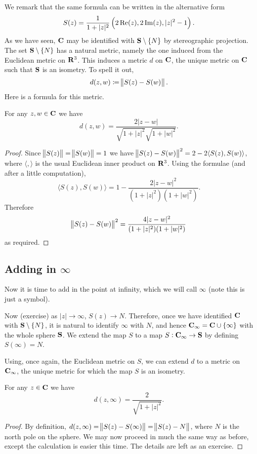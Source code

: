 We remark that the same formula can be written in the alternative form
\[S(z)=\frac{1}{1+|z|^2}\left(2\Re(z),2\Im(z),|z|^2-1\right).\]
As we have seen, $\mathbf C$ may be identified with $\mathbf S\setminus\{N\}$ by stereographic projection. The set $\mathbf S\setminus\{N\}$ has a natural metric, namely the one induced from the Euclidean metric on $\mathbf R^3$. This induces a metric $d$ on $\mathbf C$, the unique metric on $\mathbf C$ such that $\mathbf S$ is an isometry. To spell it out,
\[d(z,w)\coloneqq\norm{S(z)-S(w)}.\]
Here is a formula for this metric.
\begin{lemma}
For any $z,w\in\mathbf C$ we have
\[d(z,w)=\frac{2|z-w|}{\sqrt{1+|z|^2}\sqrt{1+|w|^2}}.\]
\end{lemma}

\begin{proof}
Since $\norm{S(z)}=\norm{S(w)}=1$ we have $\norm{S(z)-S(w)}^2=2-2\langle S(z),S(w)\rangle$, where $\langle,\rangle$ is the usual Euclidean inner product on $\mathbf R^3$. Using the formulae (and after a little computation),
\[\langle S(z),S(w)\rangle=1-\frac{2|z-w|^2}{(1+|z|^2)(1+|w|^2)}.\]
Therefore
\[\norm{S(z)-S(w)}^2=\frac{4|z-w|^2}{(1+|z|^2)(1+|w|^2)}\]
as required.
\end{proof}

\subsection{Adding in $\infty$}
Now it is time to add in the point at infinity, which we will call $\infty$ (note this is just a symbol).

Now (exercise) as $|z|\to\infty$, $S(z)\to N$. Therefore, once we have identified $\mathbf C$ with $\mathbf S\setminus\{N\}$, it is natural to identify $\infty$ with $N$, and hence $\mathbf C_\infty=\mathbf C\cup\{\infty\}$ with the whole sphere $\mathbf S$. We extend the map $S$ to a map $S:\mathbf C_\infty\to\mathbf S$ by defining $S(\infty)=N$.

Using, once again, the Euclidean metric on $S$, we can extend $d$ to a metric on $\mathbf C_\infty$, the unique metric for which the map $S$ is an isometry.

\begin{lemma}
For any $z\in\mathbf C$ we have
\[d(z,\infty)=\frac{2}{\sqrt{1+|z|^2}}.\]
\end{lemma}

\begin{proof}
By definition, $d(z,\infty)=\norm{S(z)-S(\infty)}=\norm{S(z)-N}$, where $N$ is the north pole on the sphere. We may now proceed in much the same way as before, except the calculation is easier this time. The details are left as an exercise.
\end{proof}

